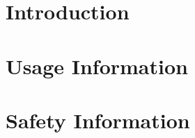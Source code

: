 \documentclass[12pt,letterpaper,onecolumn]{article}
\begin{document}

\tableofcontents
\newpage
\begin{comment}
Section: Introduction
Description: Briefly describe the product, it's purpose, it's function. Describe the items that should
	have come with the product (all boards, SD card, batteries, etc.). Describe any complementary
	items that can be used with the product (accessories, etc.)
\end{comment}
\section{Introduction}

\begin{comment}
Section: Usage Instructions
Description: Information related to the usage of the project. Describe any assembly information
	needed for this project (if the project doesn't come fully assembled). Detail navigation through
	any and all software menus. Describe important basic procedures, such as changing the batteries
	or replacing the SD card.
\end{comment}
\section[Usage]{Usage Information}

\begin{comment}
Section: Safety Information
Description: Their may be some relevant safety issues for your project that users should know. Some
	are very trivial (choking hazard, keep away from water). Some may be special information relevant
	to your product (example: if your product contains a laser, a warning about not pointing it in a
	person's eyes is probably reasonable)
\end{comment}
\section[Safety]{Safety Information}

\begin{comment}
Section: Care Information
Description: Information about maintaining a product. This section might contain information about
	replacing the batteries, or conditions for storage (ex. store in a cool, dry place). Additionally, any
	disposal or recycling instructions should be included here.
\end{comment}
\end{document}

